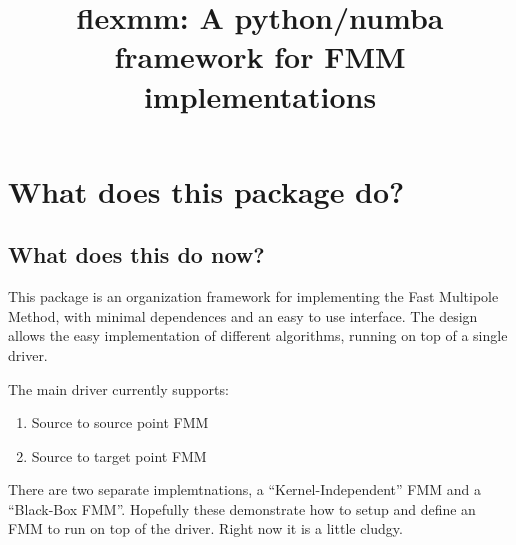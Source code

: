 \documentclass{article}
\title{flexmm: A python/numba framework for FMM implementations}
\begin{document}
\maketitle

\section{What does this package do?}

\subsection{What does this do now?}

This package is an organization framework for implementing the Fast Multipole Method, with minimal dependences and an easy to use interface. The design allows the easy implementation of different algorithms, running on top of a single driver.

The main driver currently supports:
\begin{enumerate}
	\item Source to source point FMM
	\item Source to target point FMM
\end{enumerate}

There are two separate implemtnations,  a ``Kernel-Independent'' FMM and a ``Black-Box FMM''.  Hopefully these demonstrate how to setup and define an FMM to run on top of the driver.  Right now it is a little cludgy.
\end{document}
